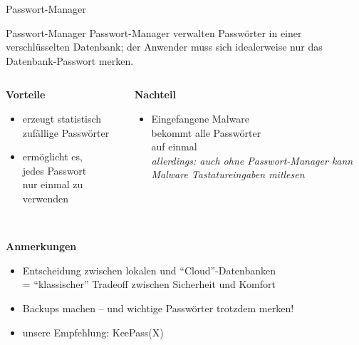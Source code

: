 \begin{frame}{Passwort-Manager}
  \begin{block}{Passwort-Manager}
    Passwort-Manager verwalten Passwörter in einer verschlüsselten Datenbank; der Anwender muss sich idealerweise nur das Datenbank-Passwort merken.
  \end{block}
  \begin{columns}
    \begin{column}{.5\textwidth}
      \pause
      \textbf{Vorteile}
      \begin{itemize}
        \small
        \item erzeugt statistisch zufällige Passwörter
        \item ermöglicht es,\\jedes Passwort\\nur einmal zu verwenden
      \end{itemize}
    \end{column}
    \begin{column}{.5\textwidth}
      \pause
      \textbf{Nachteil}
      \begin{itemize}
        \small
        \item Eingefangene Malware\\bekommt alle Passwörter\\auf einmal\\
          \textit{allerdings: auch ohne Passwort-Manager kann Malware Tastatureingaben mitlesen}
      \end{itemize}
    \end{column}
  \end{columns}
  ~\\
  \pause
  \textbf{Anmerkungen}
  \begin{itemize}
    \small
    \item Entscheidung zwischen lokalen und ``Cloud''-Datenbanken\\ = ``klassischer'' Tradeoff zwischen Sicherheit und Komfort
    \item Backups machen -- und wichtige Passwörter trotzdem merken!
    \item unsere Empfehlung: KeePass(X)
  \end{itemize}
\end{frame}

\endinput
